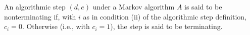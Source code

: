 An algorithmic step $(d, e)$ under a Markov algorithm $A$ is said to be nonterminating if, with $i$ as in condition (ii) of the algorithmic step definition, $c_i = 0$. Otherwise (i.e., with $c_i = 1$), the step is said to be terminating.
